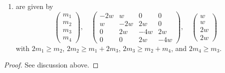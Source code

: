 \begin{lemma}
\begin{enumerate}
are given by
$$
\left(
\begin{matrix}
m_1 \\
m_2 \\
m_3 \\
m_4
\end{matrix}
\right),
\quad
\left(
\begin{matrix}
-4w & 2w & 0 & 0 \\
2w & -4w & 2w & 0 \\
0 & 2w & -4w & 2w \\
0 & 0 & 2w & -2w
\end{matrix}
\right),
\quad
\left(
\begin{matrix}
2w \\
2w \\
2w \\
w
\end{matrix}
\right)
$$
with $2m_1 \geq m_2$, $2m_2 \geq m_1 + m_3$, $2m_3 \geq m_2 + m_4$,
and $m_4 \geq m_3$, or
\item
\label{models-item-F4}
are given by
$$
\left(
\begin{matrix}
m_1 \\
m_2 \\
m_3 \\
m_4
\end{matrix}
\right),
\quad
\left(
\begin{matrix}
-2w & w & 0 & 0 \\
w & -2w & 2w & 0 \\
0 & 2w & -4w & 2w \\
0 & 0 & 2w & -4w
\end{matrix}
\right),
\quad
\left(
\begin{matrix}
w \\
w \\
2w \\
2w
\end{matrix}
\right)
$$
with $2m_1 \geq m_2$, $2m_2 \geq m_1 + 2m_3$, $2m_3 \geq m_2 + m_4$,
and $2m_4 \geq m_3$.
\end{enumerate}
\end{lemma}

\begin{proof}
See discussion above.
\end{proof}

